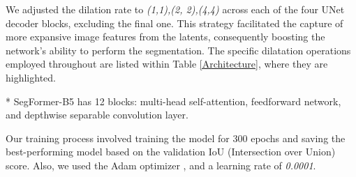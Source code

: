 \documentclass[twocolumn, switch]{article} %
\begin{document}
We adjusted the dilation rate to \textit{(1,1),(2, 2),(4,4)} across each of the four UNet decoder blocks, excluding the final one. This strategy facilitated the capture of more expansive image features from the latents, consequently boosting the network's ability to perform the segmentation. The specific dilatation operations employed throughout are listed within Table \ref{Architecture}, where they are highlighted. 

\begin{table}[H]
\centering
{}
\caption{Architecture of the solution}
\label{Architecture}
\footnotesize{* SegFormer-B5 has 12 blocks: multi-head self-attention, feedforward network, and depthwise separable convolution layer.}
\end{table}


Our training process involved training the model for 300 epochs and saving the best-performing model based on the validation IoU (Intersection over Union) score. Also, we used the Adam optimizer \cite{kingma2014adam}, and a learning rate of \textit{0.0001}. 
\end{document}
